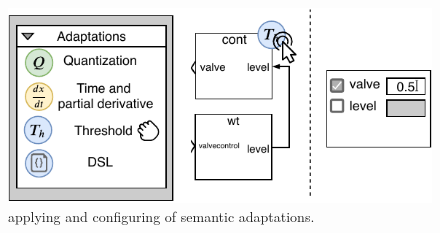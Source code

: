\begin{figure}[bt]
\centering
\includegraphics[width=0.9\columnwidth]{Images/semantic_adaptation.pdf}
\caption{applying and configuring of semantic adaptations.}
\label{fig:semantic_adaptations}
\end{figure}
